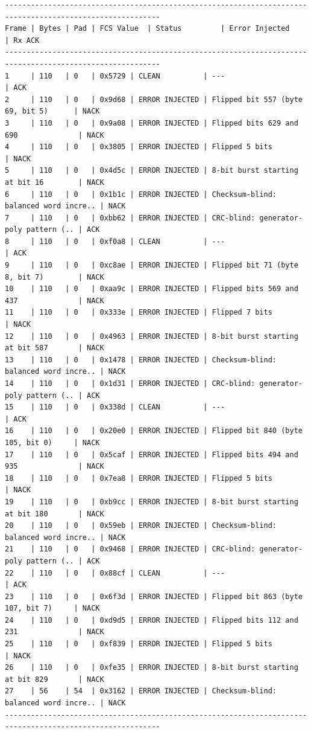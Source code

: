 \documentclass[12pt, a4paper]{article}
\begin{document}
\begin{scriptsize}
\begin{verbatim}
----------------------------------------------------------------------------------------------------------
Frame | Bytes | Pad | FCS Value  | Status         | Error Injected                        | Rx ACK
----------------------------------------------------------------------------------------------------------
1     | 110   | 0   | 0x5729 | CLEAN          | ---                                    | ACK  
2     | 110   | 0   | 0x9d68 | ERROR INJECTED | Flipped bit 557 (byte 69, bit 5)      | NACK 
3     | 110   | 0   | 0x9a08 | ERROR INJECTED | Flipped bits 629 and 690              | NACK 
4     | 110   | 0   | 0x3805 | ERROR INJECTED | Flipped 5 bits                        | NACK 
5     | 110   | 0   | 0x4d5c | ERROR INJECTED | 8-bit burst starting at bit 16        | NACK 
6     | 110   | 0   | 0x1b1c | ERROR INJECTED | Checksum-blind: balanced word incre.. | NACK 
7     | 110   | 0   | 0xbb62 | ERROR INJECTED | CRC-blind: generator-poly pattern (.. | ACK  
8     | 110   | 0   | 0xf0a8 | CLEAN          | ---                                    | ACK  
9     | 110   | 0   | 0xc8ae | ERROR INJECTED | Flipped bit 71 (byte 8, bit 7)        | NACK 
10    | 110   | 0   | 0xaa9c | ERROR INJECTED | Flipped bits 569 and 437              | NACK 
11    | 110   | 0   | 0x333e | ERROR INJECTED | Flipped 7 bits                        | NACK 
12    | 110   | 0   | 0x4963 | ERROR INJECTED | 8-bit burst starting at bit 587       | NACK 
13    | 110   | 0   | 0x1478 | ERROR INJECTED | Checksum-blind: balanced word incre.. | NACK 
14    | 110   | 0   | 0x1d31 | ERROR INJECTED | CRC-blind: generator-poly pattern (.. | ACK  
15    | 110   | 0   | 0x338d | CLEAN          | ---                                    | ACK  
16    | 110   | 0   | 0x20e0 | ERROR INJECTED | Flipped bit 840 (byte 105, bit 0)     | NACK 
17    | 110   | 0   | 0x5caf | ERROR INJECTED | Flipped bits 494 and 935              | NACK 
18    | 110   | 0   | 0x7ea8 | ERROR INJECTED | Flipped 5 bits                        | NACK 
19    | 110   | 0   | 0xb9cc | ERROR INJECTED | 8-bit burst starting at bit 180       | NACK 
20    | 110   | 0   | 0x59eb | ERROR INJECTED | Checksum-blind: balanced word incre.. | NACK 
21    | 110   | 0   | 0x9468 | ERROR INJECTED | CRC-blind: generator-poly pattern (.. | ACK  
22    | 110   | 0   | 0x88cf | CLEAN          | ---                                    | ACK  
23    | 110   | 0   | 0x6f3d | ERROR INJECTED | Flipped bit 863 (byte 107, bit 7)     | NACK 
24    | 110   | 0   | 0xd9d5 | ERROR INJECTED | Flipped bits 112 and 231              | NACK 
25    | 110   | 0   | 0xf839 | ERROR INJECTED | Flipped 5 bits                        | NACK 
26    | 110   | 0   | 0xfe35 | ERROR INJECTED | 8-bit burst starting at bit 829       | NACK 
27    | 56    | 54  | 0x3162 | ERROR INJECTED | Checksum-blind: balanced word incre.. | NACK 
----------------------------------------------------------------------------------------------------------


\end{verbatim}
\end{scriptsize}
\end{document}
